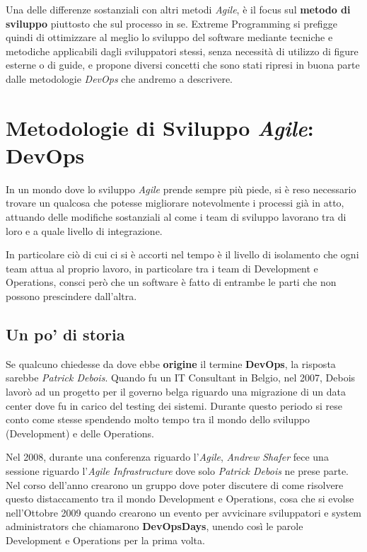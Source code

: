 \documentclass[a4paper,12pt]{report}
\begin{document}
			Una delle differenze sostanziali con altri metodi \emph{Agile}, è il focus sul \textbf{metodo di sviluppo} piuttosto che
			sul processo in se. Extreme Programming si prefigge quindi di ottimizzare al meglio lo sviluppo del software mediante 
			tecniche e metodiche applicabili dagli sviluppatori stessi, senza necessità di utilizzo di figure esterne o di guide,
			e propone diversi concetti che sono stati ripresi in buona parte dalle metodologie \emph{DevOps} che andremo a descrivere.
	
		\section{Metodologie di Sviluppo \emph{Agile}: DevOps}
		
			In un mondo dove lo sviluppo \emph{Agile} prende sempre più piede, si è reso necessario trovare un qualcosa che potesse
			migliorare notevolmente i processi già in atto, attuando delle modifiche sostanziali al come i team di sviluppo lavorano
			tra di loro e a quale livello di integrazione. 
			
			In particolare ciò di cui ci si è accorti nel tempo è il livello di isolamento che ogni team attua al proprio lavoro, in particolare tra i team di Development e Operations, consci però che un software è fatto di entrambe le parti che non possono prescindere dall'altra.
		
			\subsection{Un po' di storia}
				
				Se qualcuno chiedesse da dove ebbe \textbf{origine} il termine \textbf{DevOps}, la risposta sarebbe \emph{Patrick Debois}. Quando fu un IT Consultant in Belgio, nel 2007, Debois lavorò ad un progetto per il governo belga riguardo una migrazione di un data center dove fu in carico del testing dei sistemi. Durante questo periodo si rese conto come stesse spendendo molto tempo tra il mondo dello sviluppo (Development) e delle Operations.
				
				Nel 2008, durante una conferenza riguardo l'\emph{Agile}, \emph{Andrew Shafer} fece una sessione riguardo l'\emph{Agile Infrastructure} dove solo \emph{Patrick Debois} ne prese parte. Nel corso dell'anno crearono un gruppo dove poter discutere di come risolvere questo distaccamento tra il mondo Development e Operations, cosa che si evolse nell'Ottobre 2009 quando crearono un evento per avvicinare sviluppatori e system administrators che chiamarono \textbf{DevOpsDays}, unendo così le parole Development e Operations per la prima volta.
				
\end{document}
